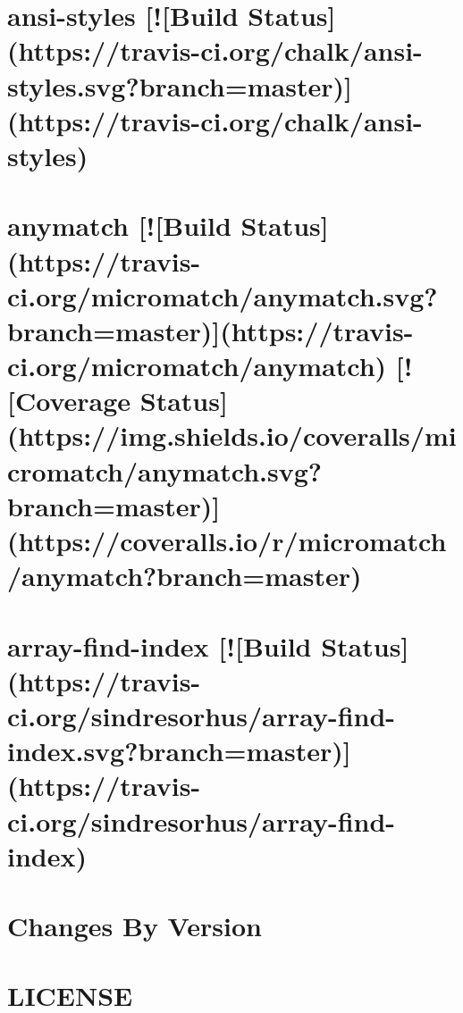 \documentclass[twoside]{book}
\newcommand{\+}{\discretionary{\mbox{\scriptsize$\hookleftarrow$}}{}{}}
\begin{document}
\chapter{ansi-\/styles \mbox{[}!\mbox{[}Build Status\mbox{]}(https\+://travis-\/ci.org/chalk/ansi-\/styles.svg?branch=master)\mbox{]}(https\+://travis-\/ci.org/chalk/ansi-\/styles)}
\label{md_dsmacc_examples_DRmerge_node_modules_ansi-styles_readme}

\chapter{anymatch \mbox{[}!\mbox{[}Build Status\mbox{]}(https\+://travis-\/ci.org/micromatch/anymatch.svg?branch=master)\mbox{]}(https\+://travis-\/ci.org/micromatch/anymatch) \mbox{[}!\mbox{[}Coverage Status\mbox{]}(https\+://img.shields.\+io/coveralls/micromatch/anymatch.svg?branch=master)\mbox{]}(https\+://coveralls.io/r/micromatch/anymatch?branch=master)}
\label{md_dsmacc_examples_DRmerge_node_modules_anymatch_README}

\chapter{array-\/find-\/index \mbox{[}!\mbox{[}Build Status\mbox{]}(https\+://travis-\/ci.org/sindresorhus/array-\/find-\/index.svg?branch=master)\mbox{]}(https\+://travis-\/ci.org/sindresorhus/array-\/find-\/index)}
\label{md_dsmacc_examples_DRmerge_node_modules_array-find-index_readme}

\chapter{Changes By Version}
\label{md_dsmacc_examples_DRmerge_node_modules_asar_CHANGELOG}

\chapter{L\+I\+C\+E\+N\+SE}
\label{md_dsmacc_examples_DRmerge_node_modules_asar_LICENSE}

\end{document}
